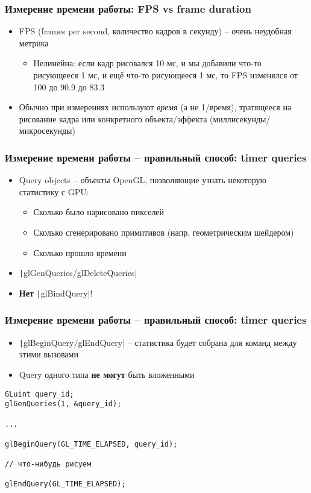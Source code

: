 \documentclass{beamer}
\begin{document}
\begin{frame}[fragile]
\frametitle{Измерение времени работы: FPS vs frame duration}
\begin{itemize}
\item FPS (frames per second, количество кадров в секунду) -- очень неудобная метрика
\pause
\begin{itemize}
\item Нелинейна: если кадр рисовался 10 мс, и мы добавили что-то рисующееся 1 мс, и ещё что-то рисующееся 1 мс, то FPS изменялся от 100 до 90.9 до 83.3
\end{itemize}
\pause
\item Обычно при измерениях используют \textit{время} (а не 1/время), тратящееся на рисование кадра или конкретного объекта/эффекта (миллисекунды/микросекунды)
\end{itemize}
\end{frame}

\begin{frame}[fragile]
\frametitle{Измерение времени работы -- правильный способ: timer queries}
\begin{itemize}
\item Query objects -- объекты OpenGL, позволяющие узнать некоторую статистику с GPU:
\pause
\begin{itemize}
\item Сколько было нарисовано пикселей
\pause
\item Сколько сгенерировано примитивов (напр. геометрическим шейдером)
\pause
\item Сколько прошло времени
\end{itemize}
\pause
\item \texttt|glGenQueries/glDeleteQueries|
\pause
\item \textbf{Нет} \texttt|glBindQuery|!
\end{itemize}
\end{frame}

\begin{frame}[fragile]
\frametitle{Измерение времени работы -- правильный способ: timer queries}
\begin{itemize}
\item \texttt|glBeginQuery/glEndQuery| -- статистика будет собрана для команд между этими вызовами
\pause
\item Query одного типа \textbf{не могут} быть вложенными
\end{itemize}
\pause
{}
\begin{verbatim}
GLuint query_id;
glGenQueries(1, &query_id);

...

glBeginQuery(GL_TIME_ELAPSED, query_id);

// что-нибудь рисуем

glEndQuery(GL_TIME_ELAPSED);
\end{verbatim}
\end{frame}
\end{document}
